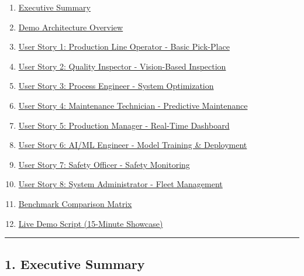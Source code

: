 \documentclass[
]{article}
\providecommand{\tightlist}{%
  \setlength{\itemsep}{0pt}\setlength{\parskip}{0pt}}
\begin{document}
\begin{enumerate}
\def\labelenumi{\arabic{enumi}.}
\tightlist
\item
  \protect\hyperlink{1-executive-summary}{Executive Summary}
\item
  \protect\hyperlink{2-demo-architecture-overview}{Demo Architecture
  Overview}
\item
  \protect\hyperlink{3-user-story-1-production-line-operator---basic-pick-place}{User
  Story 1: Production Line Operator - Basic Pick-Place}
\item
  \protect\hyperlink{4-user-story-2-quality-inspector---vision-based-inspection}{User
  Story 2: Quality Inspector - Vision-Based Inspection}
\item
  \protect\hyperlink{5-user-story-3-process-engineer---system-optimization}{User
  Story 3: Process Engineer - System Optimization}
\item
  \protect\hyperlink{6-user-story-4-maintenance-technician---predictive-maintenance}{User
  Story 4: Maintenance Technician - Predictive Maintenance}
\item
  \protect\hyperlink{7-user-story-5-production-manager---real-time-dashboard}{User
  Story 5: Production Manager - Real-Time Dashboard}
\item
  \protect\hyperlink{8-user-story-6-aiml-engineer---model-training--deployment}{User
  Story 6: AI/ML Engineer - Model Training \& Deployment}
\item
  \protect\hyperlink{9-user-story-7-safety-officer---safety-monitoring}{User
  Story 7: Safety Officer - Safety Monitoring}
\item
  \protect\hyperlink{10-user-story-8-system-administrator---fleet-management}{User
  Story 8: System Administrator - Fleet Management}
\item
  \protect\hyperlink{11-benchmark-comparison-matrix}{Benchmark
  Comparison Matrix}
\item
  \protect\hyperlink{12-live-demo-script-15-minute-showcase}{Live Demo
  Script (15-Minute Showcase)}
\end{enumerate}

\begin{center}\rule{0.5\linewidth}{0.5pt}\end{center}

\hypertarget{executive-summary}{%
\subsection{1. Executive Summary}\label{executive-summary}}
\end{document}
